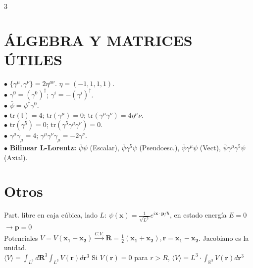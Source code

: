 \documentclass[8pt,a4paper,fleqn]{extarticle} %
\begin{document}
\begin{multicols}{3}
\section{ ÁLGEBRA Y MATRICES ÚTILES}
$\bullet$ $\{\gamma^\mu, \gamma^\nu\} = 2\eta^{\mu\nu}$. $\eta = (-1,1,1,1)$.
\\$\bullet$ $\gamma^0 = (\gamma^0)^\dagger$; $\gamma^i = -(\gamma^i)^\dagger$. \\$\bullet$ $\bar{\psi} = \psi^\dagger \gamma^0$.
\\$\bullet$ $\text{tr}(\mathbb{I}) = 4$; $\text{tr}(\gamma^\mu) = 0$; $\text{tr}(\gamma^\mu \gamma^\nu) = 4\eta^\mu\nu$.
\\$\bullet$ $\text{tr}(\gamma^5) = 0$; $\text{tr}(\gamma^5 \gamma^\mu \gamma^\nu) = 0$.
\\$\bullet$ $\gamma^\mu \gamma_\mu = 4$; $\gamma^\mu \gamma^\nu \gamma_\mu = -2\gamma^\nu$.
\\$\bullet$ \textbf{Bilinear L-Lorentz:} $\bar{\psi}\psi$ (Escalar), $\bar{\psi}\gamma^5\psi$ (Pseudoesc.), $\bar{\psi}\gamma^\mu\psi$ (Vect), $\bar{\psi}\gamma^\mu\gamma^5\psi$ (Axial).



\section{Otros}
Part. libre en caja cúbica, lado $L$: $\psi(\mathbf{x}) = \frac{1}{\sqrt{L^3}}e^{i\mathbf{x·p}/\hbar}$, en estado energía $E=0$ $\rightarrow \mathbf{p}=0$\\
 Potenciales $V=V(\mathbf{x_1-x_2})\xrightarrow{C.V.} \mathbf{R}= \tfrac{1}{2} \mathbf{(x_1+x_2)}, \mathbf{r} = \mathbf{x_1-x_2}$. 
Jacobiano es la unidad.\\ 
 $\langle V\rangle =\int_{L^3} d\mathbf{R}^3 \int_{L^3}V(\mathbf{r})d\mathbf{r}^3$ Si $V(\mathbf{r}) = 0$ para $r > R$, $\langle V\rangle =L^3\cdot \int_{\mathbb{R}^3} V(\mathbf{r})d\mathbf{r}^3$




\color{white}

\end{multicols}
\end{document}
